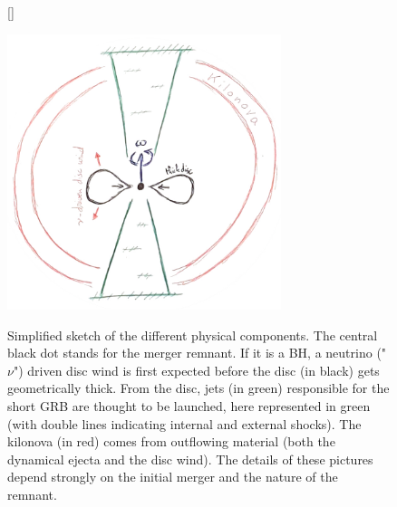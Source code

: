 \documentclass[11pt,onecolumn]{article}
\makeatletter
\newcommand{\grb}{GRB\xspace}
\newcommand*{\bh}{BH\@\xspace}
\makeatother
\begin{document}
%
%

\begin{figure}[!t]
\vspace*{-0.3cm}
[\FBwidth]
{\caption{Simplified sketch of the different physical components. The central black dot stands for the merger remnant. If it is a \bh, a neutrino ("$\nu$") driven disc wind is first expected before the disc (in black) gets geometrically thick. From the disc, jets (in green) responsible for the short \grb are thought to be launched, here represented in green (with double lines indicating internal and external shocks). The kilonova (in red) comes from outflowing material (both the dynamical ejecta and the disc wind). The details of these pictures depend strongly on the initial merger and the nature of the remnant.}\label{fig:sketch}}
{\includegraphics[width=8cm]{Figures/sketch_GRB_kilonova.jpg}}
\end{figure}
\end{document}
